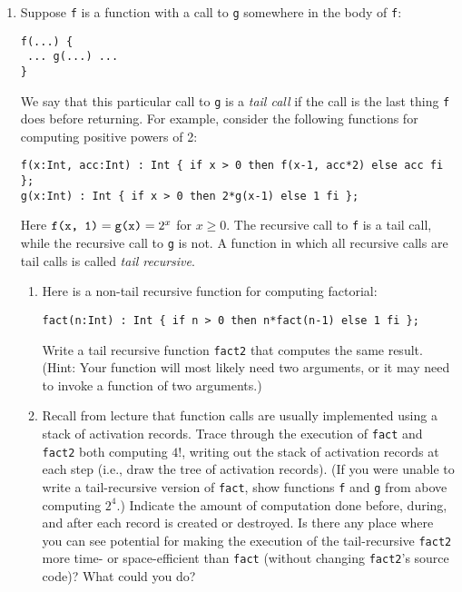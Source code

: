 \documentclass{article}
\begin{document}
\begin{enumerate}

\item Suppose \texttt{f} is a function with a call to \texttt{g}
somewhere in the body of \texttt{f}:
\begin{verbatim}
f(...) {
 ... g(...) ...
}
\end{verbatim}
We say that this particular call to \texttt{g} is a {\it tail call}
if the call is the last thing \texttt{f} does before returning.  For
example, consider the following functions for computing positive
powers of 2:
\begin{verbatim}
f(x:Int, acc:Int) : Int { if x > 0 then f(x-1, acc*2) else acc fi };
g(x:Int) : Int { if x > 0 then 2*g(x-1) else 1 fi };
\end{verbatim}
Here $\verb'f(x, 1)' = \verb'g(x)' = 2^x$ for $x\geq 0$.  The
recursive call to \texttt{f} is a tail call, while the recursive call
to \texttt{g} is not.  A function in which all recursive calls are
tail calls is called {\it tail recursive}.

\begin{enumerate}
\item Here is a non-tail recursive function for computing factorial:
\begin{verbatim}
fact(n:Int) : Int { if n > 0 then n*fact(n-1) else 1 fi };
\end{verbatim}
Write a tail recursive function \verb'fact2' that computes the same
result.  (Hint: Your function will most likely need two arguments, or
it may need to invoke a function of two arguments.)

\item Recall from lecture that function calls are usually implemented
using a stack of activation records.  Trace through the execution of
\verb'fact' and \verb'fact2' both computing $4!$, writing out the
stack of activation records at each step (i.e., draw the tree of
activation records).  (If you were unable to write a tail-recursive
version of \verb'fact', show functions \texttt{f} and \texttt{g} from
above computing $2^4$.)  Indicate the amount of computation done
before, during, and after each record is created or destroyed.  Is
there any place where you can see potential for making the execution
of the tail-recursive \verb'fact2' more time- or space-efficient than
\verb'fact' (without changing \verb'fact2''s source code)?  What could
you do?



\end{enumerate}
\end{enumerate}
\end{document}
